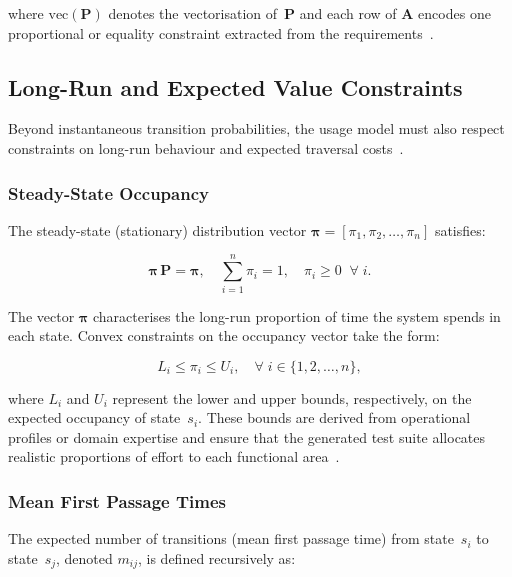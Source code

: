\noindent where $\mathrm{vec}(\mathbf{P})$ denotes the vectorisation of~$\mathbf{P}$ and each row of $\mathbf{A}$ encodes one proportional or equality constraint extracted from the requirements~\cite{emml_usage_models}.

\subsection{Long-Run and Expected Value Constraints}%
\label{subsec:longrun_constraints}

Beyond instantaneous transition probabilities, the usage model must also respect constraints on long-run behaviour and expected traversal costs~\cite{markov_reliability}.

\subsubsection{Steady-State Occupancy}
The steady-state (stationary) distribution vector $\boldsymbol{\pi} = [\pi_1, \pi_2, \dots, \pi_n]$ satisfies:

\begin{equation}
\label{eq:steady_state}
\boldsymbol{\pi}\,\mathbf{P} = \boldsymbol{\pi}, \quad \sum_{i=1}^{n} \pi_i = 1, \quad \pi_i \geq 0 \;\;\forall\; i.
\end{equation}

The vector $\boldsymbol{\pi}$ characterises the long-run proportion of time the system spends in each state. Convex constraints on the occupancy vector take the form:

\begin{equation}
\label{eq:occupancy_bounds}
L_i \leq \pi_i \leq U_i, \quad \forall\; i \in \{1, 2, \dots, n\},
\end{equation}

\noindent where $L_i$ and $U_i$ represent the lower and upper bounds, respectively, on the expected occupancy of state~$s_i$. These bounds are derived from operational profiles or domain expertise and ensure that the generated test suite allocates realistic proportions of effort to each functional area~\cite{whittaker1993markov,whittaker1994markov}.

\subsubsection{Mean First Passage Times}
The expected number of transitions (mean first passage time) from state~$s_i$ to state~$s_j$, denoted $m_{ij}$, is defined recursively as:

